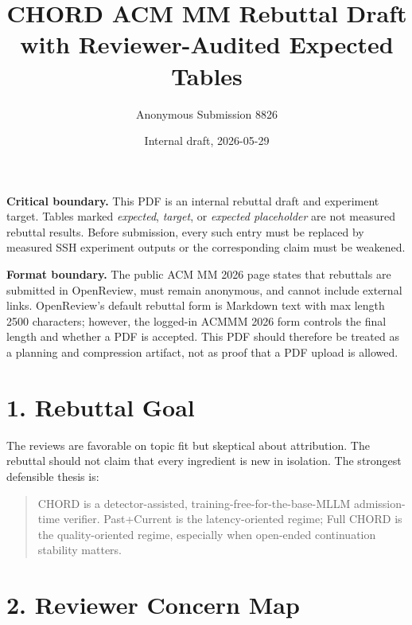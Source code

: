 \documentclass[10pt]{article}
\title{\vspace{-1.5em}CHORD ACM MM Rebuttal Draft with Reviewer-Audited Expected Tables}
\author{Anonymous Submission 8826}
\date{Internal draft, 2026-05-29}
\begin{document}
\maketitle
\vspace{-1.2em}

\textbf{Critical boundary.} This PDF is an internal rebuttal draft and experiment target. Tables marked \emph{expected}, \emph{target}, or \emph{expected placeholder} are not measured rebuttal results. Before submission, every such entry must be replaced by measured SSH experiment outputs or the corresponding claim must be weakened.

\textbf{Format boundary.} The public ACM MM 2026 page states that rebuttals are submitted in OpenReview, must remain anonymous, and cannot include external links. OpenReview's default rebuttal form is Markdown text with max length 2500 characters; however, the logged-in ACMMM 2026 form controls the final length and whether a PDF is accepted. This PDF should therefore be treated as a planning and compression artifact, not as proof that a PDF upload is allowed.

\section*{1. Rebuttal Goal}

The reviews are favorable on topic fit but skeptical about attribution. The rebuttal should not claim that every ingredient is new in isolation. The strongest defensible thesis is:

\begin{quote}
CHORD is a detector-assisted, training-free-for-the-base-MLLM admission-time verifier. Past+Current is the latency-oriented regime; Full CHORD is the quality-oriented regime, especially when open-ended continuation stability matters.
\end{quote}

\section*{2. Reviewer Concern Map}
\end{document}

